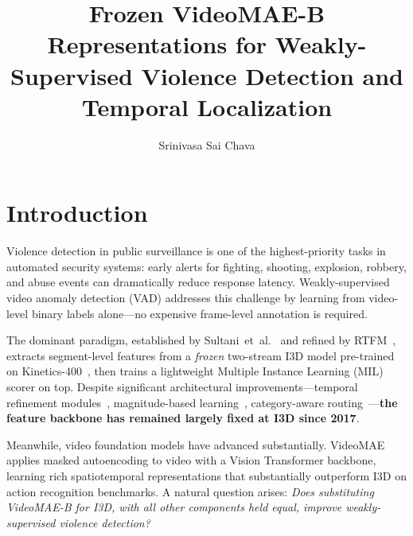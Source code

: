 \documentclass[sigconf,nonacm]{acmart}
\title[VideoMAE-B for Violence Detection]{%
Frozen VideoMAE-B Representations for
Weakly-Supervised Violence Detection and Temporal Localization}
\author{Srinivasa Sai Chava}
\affiliation{%
  \institution{Boston University}
  \city{Boston}
  \state{Massachusetts}
  \country{USA}}
\begin{document}
\renewcommand{\shortauthors}{S.~S.~Chava}

\maketitle

\pagestyle{plain}


\section{Introduction}

Violence detection in public surveillance is one of the highest-priority
tasks in automated security systems: early alerts for fighting, shooting,
explosion, robbery, and abuse events can dramatically reduce response
latency.
Weakly-supervised video anomaly detection (VAD) addresses this challenge
by learning from video-level binary labels alone—no expensive frame-level
annotation is required.

The dominant paradigm, established by Sultani~et~al.~\cite{sultani2018real}
and refined by RTFM~\cite{tian2021weakly}, extracts segment-level features
from a \emph{frozen} two-stream I3D model pre-trained on
Kinetics-400~\cite{carreira2017quo}, then trains a lightweight Multiple
Instance Learning (MIL) scorer on top.
Despite significant architectural improvements—temporal refinement
modules~\cite{wu2023surveillance}, magnitude-based
learning~\cite{tian2021weakly}, category-aware
routing~\cite{wang2025gsmoe}—\textbf{the feature backbone has remained
largely fixed at I3D since 2017}.

Meanwhile, video foundation models have advanced substantially.
VideoMAE~\cite{tong2022videomae} applies masked autoencoding to video with
a Vision Transformer backbone, learning rich spatiotemporal representations
that substantially outperform I3D on action recognition benchmarks.
A natural question arises: \emph{Does substituting VideoMAE-B for I3D,
with all other components held equal, improve weakly-supervised violence
detection?}
\end{document}
